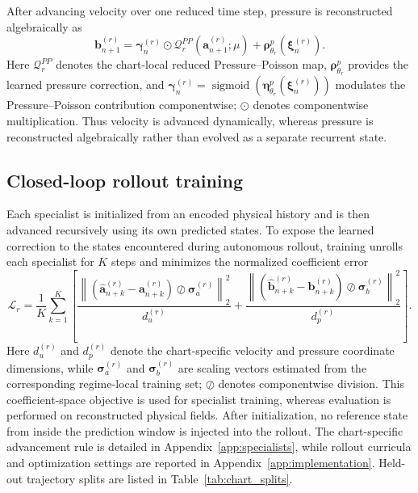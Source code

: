 \documentclass{article}
\begin{document}
After advancing velocity over one reduced time step, pressure is reconstructed algebraically as
\begin{equation}
  \bm b_{n+1}^{(r)}
  =\bm\gamma_n^{(r)}\odot\mathcal Q_r^{PP}(\bm a_{n+1}^{(r)};\mu)
  +\bm\rho^p_{\theta_r}(\bm\xi_n^{(r)}).
  \label{eq:main_pressure_closure}
\end{equation}
Here $\mathcal Q_r^{PP}$ denotes the chart-local reduced Pressure--Poisson map, $\bm\rho^p_{\theta_r}$ provides the learned pressure correction, and $\bm\gamma_n^{(r)} =\operatorname{sigmoid}(\bm\eta^p_{\theta_r}(\bm\xi_n^{(r)}))$ modulates the Pressure--Poisson contribution componentwise; $\odot$ denotes componentwise multiplication. Thus velocity is advanced dynamically, whereas pressure is reconstructed algebraically rather than evolved as a separate recurrent state.


\subsection{Closed-loop rollout training}

Each specialist is initialized from an encoded physical history and is then advanced recursively using its own predicted states. To expose the learned correction to the states encountered during autonomous rollout, training unrolls each specialist for $K$ steps and minimizes the
normalized coefficient error
\begin{equation}
  \mathcal L_r=\frac{1}{K}\sum_{k=1}^{K}\left[
  \frac{\left\|(\widehat{\bm a}_{n+k}^{(r)}-\bm a_{n+k}^{(r)})
  \oslash\bm\sigma_a^{(r)}\right\|_2^2}{d_u^{(r)}}
  +\frac{\left\|(\widehat{\bm b}_{n+k}^{(r)}-\bm b_{n+k}^{(r)})
  \oslash\bm\sigma_b^{(r)}\right\|_2^2}{d_p^{(r)}}\right].
  \label{eq:main_rollout_loss}
\end{equation}
Here $d_u^{(r)}$ and $d_p^{(r)}$ denote the chart-specific velocity and pressure coordinate dimensions, while $\bm\sigma_a^{(r)}$ and $\bm\sigma_b^{(r)}$ are scaling
vectors estimated from the corresponding regime-local training set; $\oslash$ denotes componentwise division. This coefficient-space objective is used for specialist training, whereas evaluation is performed on reconstructed physical fields. After initialization, no reference state from inside the prediction window is injected into the rollout. The chart-specific advancement rule is detailed in Appendix~\ref{app:specialists}, while rollout curricula and optimization settings are reported in Appendix~\ref{app:implementation}. Held-out trajectory splits are listed in Table~\ref{tab:chart_splits}.
\end{document}
